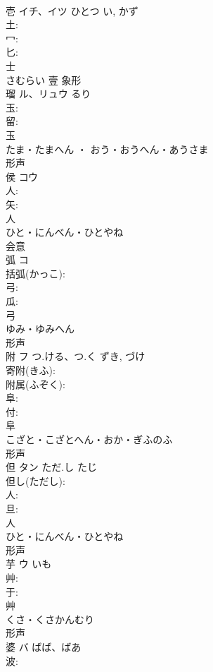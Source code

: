 \documentclass[8pt]{extreport}
\begin{document}
\begin{CJK}{UTF8}{min}
\\	壱	イチ、イツ	ひとつ	い, かず	
\\	土: 
\\	冖: 
\\	匕: 
\\	士	
\\	さむらい	壹	象形 
\\	瑠	ル、リュウ		るり	
\\	玉: 
\\	留: 
\\	玉	
\\	たま・たまへん ・ おう・おうへん・あうさま	
\\	形声 
\\	侯	コウ			
\\	人: 
\\	矢: 
\\	人	
\\	ひと・にんべん・ひとやね	
\\	会意 
\\	弧	コ			
\\	括弧(かっこ): 
\\	弓: 
\\	瓜: 
\\	弓	
\\	ゆみ・ゆみへん	
\\	形声 
\\	附	フ	つ.ける、つ.く	ずき, づけ	
\\	寄附(きふ): 
\\	附属(ふぞく): 
\\	阜: 
\\	付: 
\\	阜	
\\	こざと・こざとへん・おか・ぎふのふ	
\\	形声 
\\	但	タン	ただ.し	たじ	
\\	但し(ただし): 
\\	人: 
\\	旦: 
\\	人	
\\	ひと・にんべん・ひとやね	
\\	形声 
\\	芋	ウ	いも		
\\	艸: 
\\	于: 
\\	艸	
\\	くさ・くさかんむり	
\\	形声 
\\	婆	バ	ばば、ばあ		
\\	波: 

\end{CJK}
\end{document}
